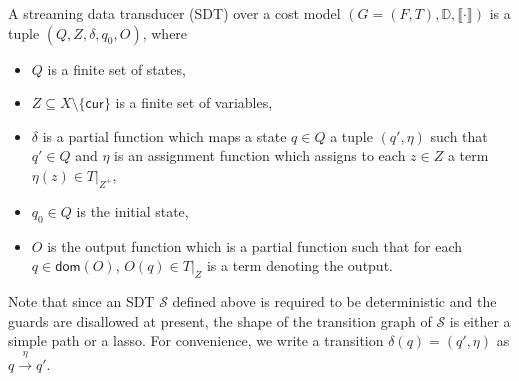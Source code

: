 \documentclass[runningheads,a4paper]{llncs}
\newcommand\cur{\mathsf{cur}}
\newcommand\dom{\mathsf{dom}}
\newcommand\dd{\mathbb{D}}
\newcommand\Ss{\mathcal{S}}
\begin{document}
A streaming data transducer (SDT) over a cost model $(G=(F, T), \dd, \llbracket \cdot \rrbracket)$ is a tuple $(Q, Z, \delta, q_0, O)$, where 
\begin{itemize}
\item $Q$ is a finite set of states, 

\item $Z \subseteq X \setminus \{\cur\}$ is a finite set of variables, 

\item $\delta$ is a partial function which maps a state $q \in Q$ a tuple $(q',\eta)$  such that $q' \in Q$ and $\eta$ is an assignment function which assigns to each $z \in Z$ a term $\eta(z) \in T \vert_{Z^+}$, 

\item $q_0 \in Q$ is the initial state, 

\item $O$ is the output function which is a partial function such that for each $q \in \dom(O)$, $O(q) \in T \vert_Z$ is a term denoting the output.
\end{itemize}
Note that since an SDT $\Ss$ defined above is required to be deterministic and the guards are disallowed at present, the shape of the transition graph of $\Ss$ is either a simple path or a lasso. For convenience, we write a transition $\delta(q) = (q',\eta)$ as $q \xrightarrow{\eta} q'$.
\end{document}
